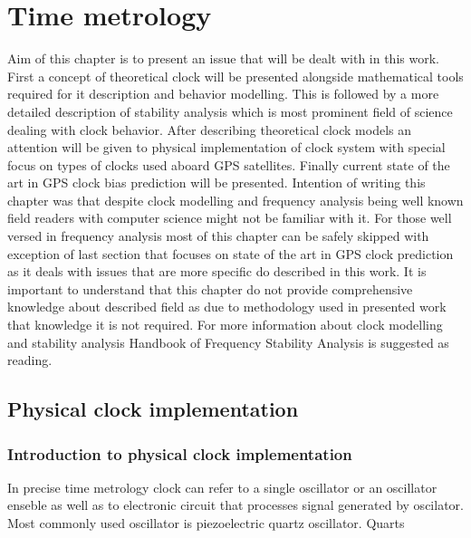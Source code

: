 \chapter{Time metrology}
Aim of this chapter is to present an issue that will be dealt with in this work.
First a concept of theoretical clock will be presented alongside mathematical tools required
for it description and behavior modelling.
This is followed by a more detailed description of stability analysis which is most prominent
field of science dealing with clock behavior.
After describing theoretical clock models an attention will be given to physical implementation
of clock system with special focus on types of clocks used aboard GPS satellites.
Finally current state of the art in GPS clock bias prediction will be presented.
Intention of writing this chapter was that despite clock modelling and frequency analysis being
well known field readers with computer science might not be familiar with it.
For those well versed in frequency analysis most of this chapter can be safely skipped with 
exception of last section that focuses on state of the art in GPS clock prediction as it 
deals with issues that are more specific do described in this work.
It is important to understand that this chapter do not provide comprehensive knowledge about
described field as due to methodology used in presented work that knowledge it is not required.
For more information about clock modelling and stability analysis Handbook of Frequency Stability
Analysis is suggested as reading.


\section{Physical clock implementation}
\label{sec:physical_clock}

\subsection{Introduction to physical clock implementation}
In precise time metrology clock can refer to a single oscillator or an oscillator enseble
as well as to electronic circuit that processes signal generated by oscilator.
Most commonly used oscillator is piezoelectric quartz oscillator.
Quarts 

